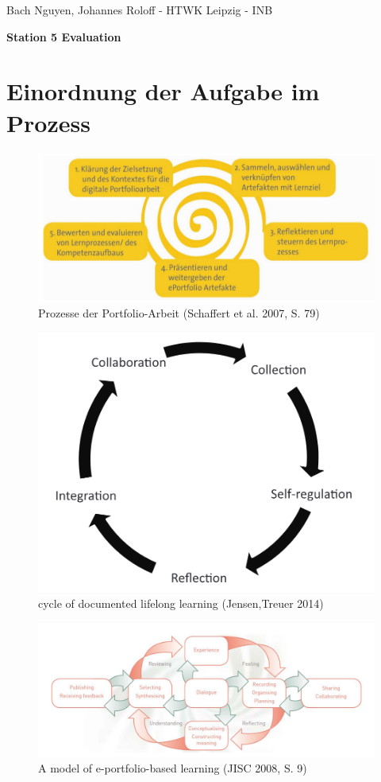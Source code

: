 \documentclass[a4paper,oneside]{scrarticle}
\begin{document}
	\begin{flushleft}
		Bach Nguyen, Johannes Roloff - HTWK Leipzig - INB
	\end{flushleft}
	\begin{center}
		\begin{LARGE}
			\textbf{Station 5 Evaluation}
		\end{LARGE}
	\end{center}
	\section*{Einordnung der Aufgabe im Prozess}
	\begin{figure} [h]
		\centering
		\includegraphics[width=0.7\linewidth]{e-portfolio-prozesse-schaffert}
		\caption{Prozesse der Portfolio-Arbeit (Schaffert et al. 2007, S. 79)}
		\label{fig:e-portfolio-prozesse-schaffert}
	\end{figure}
	\begin{figure}[h]
		\centering
		\includegraphics[width=0.5\linewidth]{cycle-of-documented-lifelong-learning-Jensen}
		\caption{cycle of documented lifelong learning (Jensen,Treuer 2014)}
		\label{fig:cycle-of-documented-lifelong-learning-jensen}
	\end{figure}
	\begin{figure}[h]
		\centering
		\includegraphics[width=0.8\linewidth]{model-of-e-portfolio-based-learning}
		\caption{A model of e-portfolio-based learning (JISC 2008, S. 9)}
		\label{fig:model-of-e-portfolio-based-learning}
	\end{figure}
\end{document}
